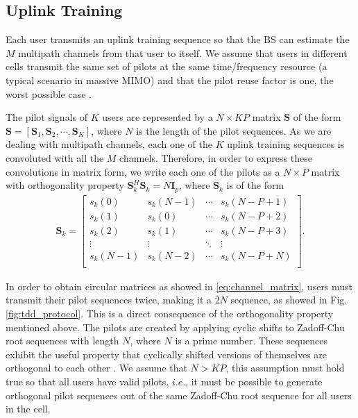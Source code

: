 \documentclass[journal,12pt,onecolumn]{IEEEtran}
\begin{document}
\subsection{Uplink Training}
Each user transmits an uplink training sequence so that the BS can estimate the $M$ multipath channels from that user to itself. We assume that users in different cells transmit the same set of pilots at the same time/frequency resource (a typical scenario in massive MIMO) and that the pilot reuse factor is one, the worst possible case \cite{marzetta:noncooperative}.

The pilot signals of $K$ users are represented by a $N \times KP$ matrix $\textbf{S}$ of the form $\textbf{S} = \left[ \textbf{S}_{1},  \textbf{S}_{2},  \cdots, \textbf{S}_{K}\right]$, where $N$ is the length of the pilot sequences. As we are dealing with multipath channels, each one of the $K$ uplink training sequences is convoluted with all the $M$ channels. Therefore, in order to express these convolutions in matrix form, we write each one of the pilots as a $N \times P$ matrix with orthogonality property $\textbf{S}_{k}^{H} \textbf{S}_{k} = N\textbf{I}_{p}$, where $ \textbf{S}_{k}$ is of the form
\begin{equation}\label{eq:pilot_matrix}
\begin{split}
\textbf{S}_{k} = \left[\begin{array}{cccc}
{s}_{k}(0) & {s}_{k}(N-1) & \cdots & {s}_{k}(N-P+1) \\
{s}_{k}(1) & {s}_{k}(0) & \cdots & {s}_{k}(N-P+2) \\
{s}_{k}(2) & {s}_{k}(1) & \cdots & {s}_{k}(N-P+3) \\
\vdots & \vdots & \ddots & \vdots \\
{s}_{k}(N-1) & {s}_{k}(N-2) & \cdots & {s}_{k}(N-P+N) \\ \end{array} \right].
\end{split}
\end{equation}

In order to obtain circular matrices as showed in \eqref{eq:channel_matrix}, users must transmit their pilot sequences twice, making it a $2N$ sequence, as showed in Fig. \ref{fig:tdd_protocol}. This is a direct consequence of the orthogonality property mentioned above. The pilots are created by applying cyclic shifts to Zadoff-Chu root sequences with length $N$, where $N$ is a prime number. These sequences exhibit the useful property that cyclically shifted versions of themselves are orthogonal to each other \cite{zadoffchu:zadoffchu}.
We assume that $N > KP$, this assumption must hold true so that all users have valid pilots, $i.e.$, it must be possible to generate orthogonal pilot sequences out of the same Zadoff-Chu root sequence for all users in the cell.
\end{document}
